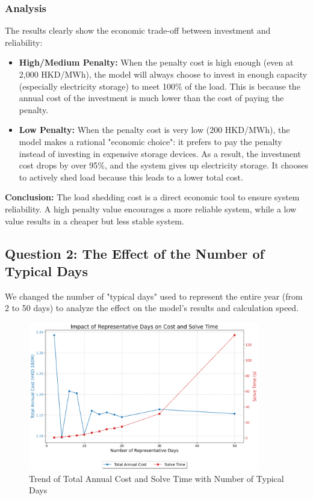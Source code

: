 \documentclass[12pt, a4paper]{article}
\begin{document}
\subsubsection*{Analysis}
The results clearly show the economic trade-off between investment and reliability:
\begin{itemize}
	\item \textbf{High/Medium Penalty:} When the penalty cost is high enough (even at 2,000 HKD/MWh), the model will always choose to invest in enough capacity (especially electricity storage) to meet 100\% of the load. This is because the annual cost of the investment is much lower than the cost of paying the penalty.
	\item \textbf{Low Penalty:} When the penalty cost is very low (200 HKD/MWh), the model makes a rational "economic choice": it prefers to pay the penalty instead of investing in expensive storage devices. As a result, the investment cost drops by over 95\%, and the system gives up electricity storage. It chooses to actively shed load because this leads to a lower total cost.
\end{itemize}
\textbf{Conclusion:} The load shedding cost is a direct economic tool to ensure system reliability. A high penalty value encourages a more reliable system, while a low value results in a cheaper but less stable system.

\subsection{Question 2: The Effect of the Number of Typical Days}
We changed the number of "typical days" used to represent the entire year (from 2 to 50 days) to analyze the effect on the model's results and calculation speed.

\begin{figure}[ht]
    \centering
    \includegraphics[width=0.9\textwidth]{plots/days_sweep_analysis.png}
    \caption{Trend of Total Annual Cost and Solve Time with Number of Typical Days}
    \label{fig:days_sweep}
\end{figure}
\end{document}
